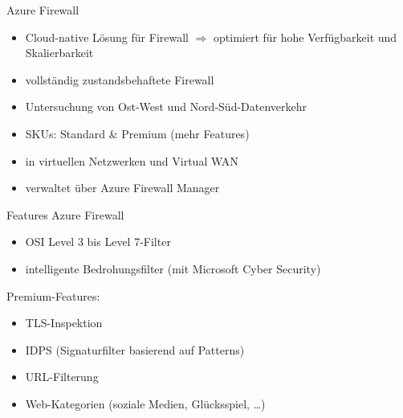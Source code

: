 \begin{flashcard}[]{Azure Firewall}
  \begin{itemize}
    \item Cloud-native Lösung für Firewall\newline
      $\Rightarrow$ optimiert für hohe Verfügbarkeit und Skalierbarkeit
    \item vollständig zustandsbehaftete Firewall
    \item Untersuchung von Ost-West und Nord-Süd-Datenverkehr
    \item SKUs: Standard \& Premium (mehr Features)
    \item in virtuellen Netzwerken und Virtual WAN
    \item verwaltet über Azure Firewall Manager
  \end{itemize}
\end{flashcard}

\begin{flashcard}[]{Features Azure Firewall}
  \begin{itemize}
    \item OSI Level 3 bis Level 7-Filter
    \item intelligente Bedrohungsfilter (mit Microsoft Cyber Security)
  \end{itemize}
  Premium-Features:
  \begin{itemize}
    \item TLS-Inspektion
    \item IDPS (Signaturfilter basierend auf Patterns)
    \item URL-Filterung
    \item Web-Kategorien (soziale Medien, Glücksspiel, \ldots)
  \end{itemize}
\end{flashcard}

